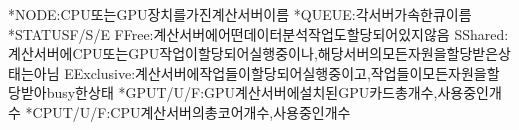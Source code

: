 \documentclass[a4paper,10pt,english]{sphinxmanual}
\begin{document}
\begin{sphinxVerbatim}[commandchars=\\\{\}]
*NODE:CPU또는GPU장치를가진계산서버이름
*QUEUE:각서버가속한큐이름
*STATUSF/S/E
\PYGZhy{}FFree:계산서버에어떤데이터분석작업도할당되어있지않음
\PYGZhy{}SShared:계산서버에CPU또는GPU작업이할당되어실행중이나,해당서버의모든자원을할당받은상태는아님
\PYGZhy{}EExclusive:계산서버에작업들이할당되어실행중이고,작업들이모든자원을할당받아busy한상태
*\PYG{o}{[}GPU\PYG{o}{]}T/U/F:GPU계산서버에설치된GPU카드총개수,사용중인개수
*\PYG{o}{[}CPU\PYG{o}{]}T/U/F:CPU계산서버의총코어개수,사용중인개수
\end{sphinxVerbatim}
\end{document}
